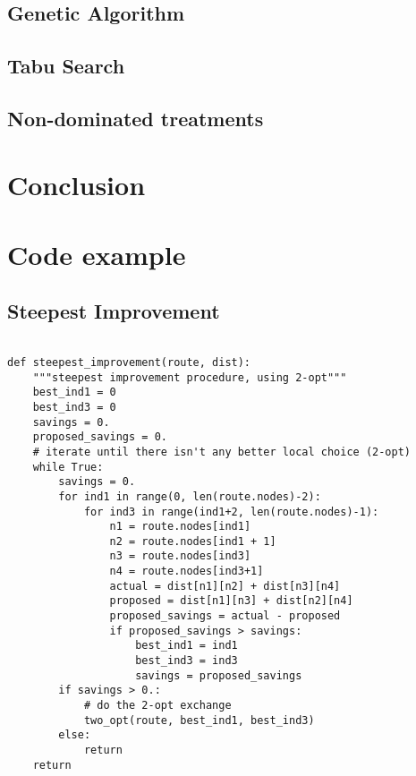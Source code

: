 \documentclass{article} %
\begin{document}
\subsection{Genetic Algorithm}



\subsection{Tabu Search}



\subsection{Non-dominated treatments}



\section{Conclusion}







\section{Code example}


\subsection{Steepest Improvement}
\label{code_steepest_improvement}
\begin{verbatim}

def steepest_improvement(route, dist):
    """steepest improvement procedure, using 2-opt"""
    best_ind1 = 0
    best_ind3 = 0
    savings = 0.
    proposed_savings = 0.
    # iterate until there isn't any better local choice (2-opt)
    while True:
        savings = 0.
        for ind1 in range(0, len(route.nodes)-2):
            for ind3 in range(ind1+2, len(route.nodes)-1):
                n1 = route.nodes[ind1]
                n2 = route.nodes[ind1 + 1]
                n3 = route.nodes[ind3]
                n4 = route.nodes[ind3+1]
                actual = dist[n1][n2] + dist[n3][n4]
                proposed = dist[n1][n3] + dist[n2][n4]
                proposed_savings = actual - proposed
                if proposed_savings > savings:
                    best_ind1 = ind1
                    best_ind3 = ind3
                    savings = proposed_savings
        if savings > 0.:
        	# do the 2-opt exchange
            two_opt(route, best_ind1, best_ind3)
        else:
            return
    return
\end{verbatim}
\end{document}
